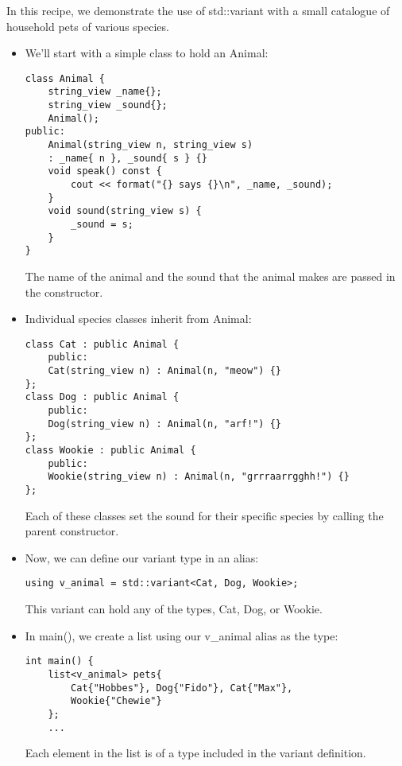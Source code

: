 In this recipe, we demonstrate the use of std::variant with a small catalogue of household pets of various species.

\begin{itemize}
\item 
We'll start with a simple class to hold an Animal:

\begin{lstlisting}[style=styleCXX]
class Animal {
	string_view _name{};
	string_view _sound{};
	Animal();
public:
	Animal(string_view n, string_view s)
	: _name{ n }, _sound{ s } {}
	void speak() const {
		cout << format("{} says {}\n", _name, _sound);
	}
	void sound(string_view s) {
		_sound = s;
	}
}
\end{lstlisting}

The name of the animal and the sound that the animal makes are passed in the constructor.

\item 
Individual species classes inherit from Animal:

\begin{lstlisting}[style=styleCXX]
class Cat : public Animal {
	public:
	Cat(string_view n) : Animal(n, "meow") {}
};
class Dog : public Animal {
	public:
	Dog(string_view n) : Animal(n, "arf!") {}
};
class Wookie : public Animal {
	public:
	Wookie(string_view n) : Animal(n, "grrraarrgghh!") {}
};
\end{lstlisting}

Each of these classes set the sound for their specific species by calling the parent constructor.

\item 
Now, we can define our variant type in an alias:

\begin{lstlisting}[style=styleCXX]
using v_animal = std::variant<Cat, Dog, Wookie>;
\end{lstlisting}

This variant can hold any of the types, Cat, Dog, or Wookie.

\item 
In main(), we create a list using our v\_animal alias as the type:

\begin{lstlisting}[style=styleCXX]
int main() {
	list<v_animal> pets{
		Cat{"Hobbes"}, Dog{"Fido"}, Cat{"Max"},
		Wookie{"Chewie"}
	};
	...
\end{lstlisting}

Each element in the list is of a type included in the variant definition.


\end{itemize}
